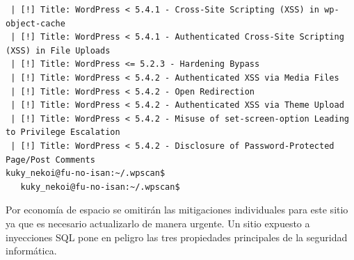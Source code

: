 \documentclass[11pt]{utalcaDoc}
\begin{document}
\begin{verbatim}
 | [!] Title: WordPress < 5.4.1 - Cross-Site Scripting (XSS) in wp-object-cache
 | [!] Title: WordPress < 5.4.1 - Authenticated Cross-Site Scripting (XSS) in File Uploads
 | [!] Title: WordPress <= 5.2.3 - Hardening Bypass
 | [!] Title: WordPress < 5.4.2 - Authenticated XSS via Media Files
 | [!] Title: WordPress < 5.4.2 - Open Redirection
 | [!] Title: WordPress < 5.4.2 - Authenticated XSS via Theme Upload
 | [!] Title: WordPress < 5.4.2 - Misuse of set-screen-option Leading to Privilege Escalation
 | [!] Title: WordPress < 5.4.2 - Disclosure of Password-Protected Page/Post Comments
kuky_nekoi@fu-no-isan:~/.wpscan$ 
   kuky_nekoi@fu-no-isan:~/.wpscan$    
\end{verbatim}

Por economía de espacio se omitirán las mitigaciones individuales para este sitio ya que es necesario actualizarlo de manera urgente. Un sitio expuesto a inyecciones SQL pone en peligro las tres propiedades principales de la seguridad informática.
\end{document}
